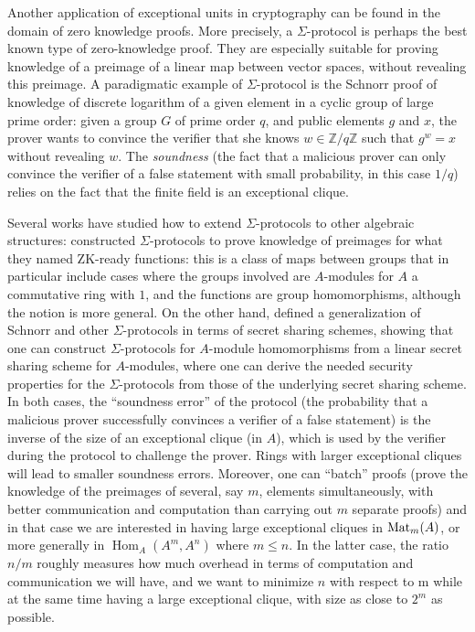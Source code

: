 \documentclass{amsart}
\theoremstyle{plain}
\theoremstyle{definition}
\DeclareMathOperator{\Hom}{Hom}
\newcommand{\Z}{\ensuremath{\mathbb{Z}}}
\begin{document}
Another application of exceptional units in cryptography can be found in the domain of zero knowledge proofs. More precisely, a $\Sigma$-protocol is perhaps the best known type of zero-knowledge proof. They are especially suitable for proving knowledge of a preimage of a linear map between vector spaces, without revealing this preimage. A paradigmatic example of $\Sigma$-protocol is the Schnorr proof of knowledge of discrete logarithm of a given element in a cyclic group of large prime order: given a group $G$ of prime order $q$, and public elements $g$ and $x$, the prover wants to convince the verifier that she knows $w\in\Z/q\Z$ such that $g^w=x$ without revealing $w$. The \textit{soundness} (the fact that a malicious prover can only convince the verifier of a false statement with small probability, in this case $1/q$) relies on the fact that the finite field is an exceptional clique.

Several works have studied how to extend $\Sigma$-protocols to other algebraic structures: \cite{CD09, CDK15} constructed $\Sigma$-protocols to prove knowledge of preimages for what they named ZK-ready functions: this is a class of maps between groups that in particular include cases where the groups involved are $A$-modules for $A$ a commutative ring with $1$, and the functions are group homomorphisms, although the notion is more general. On the other hand, \cite{BC24} defined a generalization of Schnorr and other $\Sigma$-protocols in terms of secret sharing schemes, showing that one can construct $\Sigma$-protocols for $A$-module homomorphisms from a linear secret sharing scheme for $A$-modules, where one can derive the needed security properties for the $\Sigma$-protocols from those of the underlying secret sharing scheme. In both cases, the ``soundness error'' of the protocol (the probability that a malicious prover successfully convinces a verifier of a false statement) is the inverse of the size of an exceptional clique (in $A$), which is used by the verifier during the protocol to challenge the prover. Rings with larger exceptional cliques will lead to smaller soundness errors.
Moreover, one can ``batch'' proofs (prove the knowledge of the preimages of several, say $m$, elements simultaneously, with better communication and computation than carrying out $m$ separate proofs) and in that case we are interested in having large exceptional cliques in $\textup{Mat}_m(A)$, or more generally in $\Hom_A(A^m, A^n)$ where $m\leq n$. In the latter case, the ratio $n/m$ roughly measures how much overhead in terms of computation and communication we will have, and we want to minimize $n$ with respect to m while at the same time having a large exceptional clique, with size as close to $2^m$ as possible. 
\end{document}
